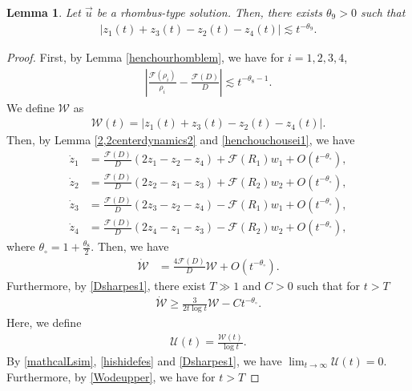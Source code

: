 \documentclass[10pt,a4paper]{amsart}
\newtheorem{lemma}[theorem]{Lemma}
\numberwithin{equation}{section}
\begin{document}
\begin{lemma}\label{naisekirhomblem2}
Let $\vec{u}$ be a rhombus-type solution. Then, there exists $\theta_9>0$ such that 
\begin{align}\label{heimenseies1}
\left|z_1(t)+z_3(t)-z_2(t)-z_4(t)\right|\lesssim t^{-\theta_9}.
\end{align}
\end{lemma}
\begin{proof}
First, by Lemma \ref{henchourhomblem}, we have for $i=1,2,3,4$,
\begin{align}\label{henchouchousei1}
\left|\frac{\mathcal{F}(\rho_i)}{\rho_i}-\frac{\mathcal{F}(D)}{D}\right|\lesssim t^{-\theta_8-1}.
\end{align}
We define $\mathcal{W}$ as 
\begin{align*}
\mathcal{W}(t)=\left|z_1(t)+z_3(t)-z_2(t)-z_4(t)\right|.
\end{align*}
Then, by Lemma \ref{2,2centerdynamics2} and \eqref{henchouchousei1}, we have
\begin{align*}
\dot{z}_1&=\frac{\mathcal{F}(D)}{D}\left(2z_1-z_2-z_4\right)+\mathcal{F}(R_1)w_1+O\left(t^{-\theta_{\circ}}\right),
\\
\dot{z}_2&=\frac{\mathcal{F}(D)}{D}\left(2z_2-z_1-z_3\right)+\mathcal{F}(R_2)w_2+O\left(t^{-\theta_{\circ}}\right),
\\
\dot{z}_3&=\frac{\mathcal{F}(D)}{D}\left(2z_3-z_2-z_4\right)-\mathcal{F}(R_1)w_1+O\left(t^{-\theta_{\circ}}\right),
\\
\dot{z}_4&=\frac{\mathcal{F}(D)}{D}\left(2z_4-z_1-z_3\right)-\mathcal{F}(R_2)w_2+O\left(t^{-\theta_{\circ}}\right),
\end{align*}
where $\theta_{\circ}=1+\frac{\theta_8}{2}$. Then, we have
\begin{align}\label{mathcalWbibun}
\dot{\mathcal{W}}&=\frac{4\mathcal{F}(D)}{D}\mathcal{W}+O\left(t^{-\theta_{\circ}}\right).
\end{align}
Furthermore, by \eqref{Dsharpes1}, there exist $T\gg 1$ and $C>0$ such that for $t>T$
\begin{align}\label{Wodeupper}
\dot{\mathcal{W}}\geq \frac{3}{2t\log{t}}\mathcal{W}-Ct^{-\theta_{\circ}}.
\end{align}
Here, we define 
\begin{align*}
\mathcal{U}(t)=\frac{\mathcal{W}(t)}{\log{t}}.
\end{align*}
By \eqref{mathcalLsim},  \eqref{hishidefes} and \eqref{Dsharpes1}, we have $\lim_{t\to\infty} \mathcal{U}(t)=0$. Furthermore, by \eqref{Wodeupper}, we have for $t>T$

\end{proof}
\end{document}

